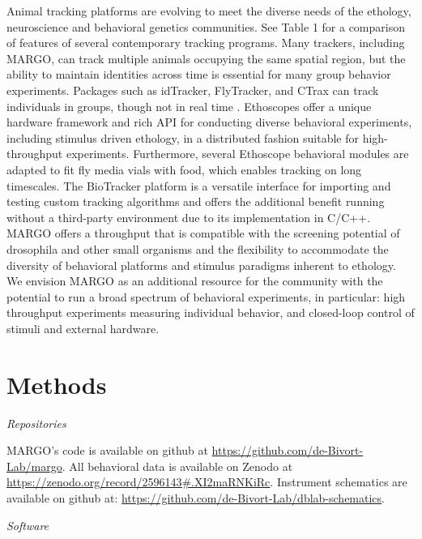 \documentclass[10pt]{article}
\begin{document}
\begin{multicols}{2}
Animal tracking platforms are evolving to meet the diverse needs of the ethology, neuroscience and behavioral genetics communities. See Table 1 for a comparison of features of several contemporary tracking programs. Many trackers, including MARGO, can track multiple animals occupying the same spatial region, but the ability to maintain identities across time is essential for many group behavior experiments. Packages such as idTracker, FlyTracker, and CTrax can track individuals in groups, though not in real time \cite{Prez-Escudero_idTracker_2014,Eyjolfsdottir_Detecting_2014,Branson_High_2009}. Ethoscopes offer a unique hardware framework and rich API for conducting diverse behavioral experiments, including stimulus driven ethology, in a distributed fashion suitable for high-throughput experiments\cite{Geissmann_Ethoscopes_2017}. Furthermore, several Ethoscope behavioral modules are adapted to fit fly media vials with food, which enables tracking on long timescales. The BioTracker platform is a versatile interface for importing and testing custom tracking algorithms and offers the additional benefit running without a third-party environment due to its implementation in C/C++\cite{Mnck_BioTracker_2018}. MARGO offers a throughput that is compatible with the screening potential of drosophila and other small organisms and the flexibility to accommodate the diversity of behavioral platforms and stimulus paradigms inherent to ethology. We envision MARGO as an additional resource for the community with the potential to run a broad spectrum of behavioral experiments, in particular: high throughput experiments measuring individual behavior, and closed-loop control of stimuli and external hardware. 

\section*{Methods}

\noindent\textit{Repositories}
\vspace*{0.3cm}

MARGO's code is available on github at \href{https://github.com/de-Bivort-Lab/margo}{https://github.com/de-Bivort-Lab/margo}. All behavioral data is available on Zenodo at \href{https://zenodo.org/record/2596143#.XI2maRNKiRc}{https://zenodo.org/record/2596143#.XI2maRNKiRc}. Instrument schematics are available on github at: \href{https://github.com/de-Bivort-Lab/dblab-schematics}{https://github.com/de-Bivort-Lab/dblab-schematics}.


\vspace*{0.5cm}
\noindent\textit{Software}
\vspace*{0.3cm}


\end{multicols}
\end{document}
